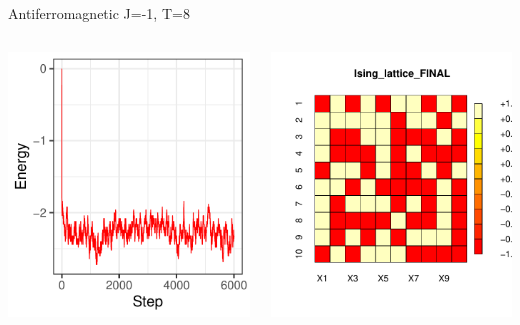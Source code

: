 \documentclass{beamer}
\begin{document}
\begin{frame}{Antiferromagnetic J=-1, T=8}
\begin{columns}
\begin{column}{0.5\textwidth}
    \begin{center}
     \includegraphics[width=\textwidth]{Pic/J-1_60_2500_T=8_ENERGY.pdf}
     \end{center}
\end{column}
\begin{column}{0.5\textwidth}
    \begin{center}
     \includegraphics[width=\textwidth]{Pic/J-1_60_2500_T=8_FINAL.pdf}

\end{center}
\end{column}
\end{columns}
\end{frame}
\end{document}
